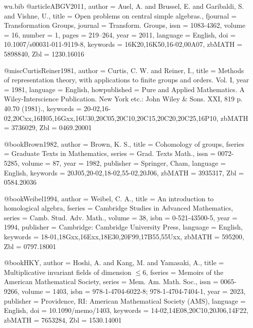 \documentclass[12pt,a4paper]{article}
\theoremstyle{definition}
\begin{document}
\begin{filecontents}{wu.bib}
@article{ABGV2011,
	author = {Auel, A. and Brussel, E. and Garibaldi, S. and Vishne, U.},
	title = {Open problems on central simple algebras.},
	fjournal = {Transformation Groups},
	journal = {Transform. Groups},
	issn = {1083-4362},
	volume = {16},
	number = {1},
	pages = {219--264},
	year = {2011},
	language = {English},
	doi = {10.1007/s00031-011-9119-8},
	keywords = {16K20,16K50,16-02,00A07},
	zbMATH = {5898840},
	Zbl = {1230.16016}
}	
	
	

@misc{CurtisReiner1981,
	author = {Curtis, C. W. and Reiner, I.},
title = {Methods of representation theory, with applications to finite groups
and orders. {Vol}. {I}}, year = {1981}, language = {English}, howpublished =
{Pure and {Applied} {Mathematics}. {A} {Wiley}-{Interscience} {Publication}.
{New} {York} etc.: {John} {Wiley} \& {Sons}. {XXI}, 819 p. {{\textsterling}}
40.70 (1981).}, keywords =
{20-02,16-02,20Cxx,16H05,16Gxx,16U30,20C05,20C10,20C15,20C20,20C25,16P10},
zbMATH = {3736029}, Zbl = {0469.20001} }

@book{Brown1982,
    author = {Brown, K. S.},
    title = {Cohomology of groups},
    fseries = {Graduate Texts in Mathematics},
    series = {Grad. Texts Math.},
    issn = {0072-5285},
    volume = {87},
    year = {1982},
    publisher = {Springer, Cham},
    language = {English},
    keywords = {20J05,20-02,18-02,55-02,20J06},
    zbMATH = {3935317},
    Zbl = {0584.20036}
}

@book{Weibel1994,
    author = {Weibel, C. A.},
    title = {An introduction to homological algebra},
    fseries = {Cambridge Studies in Advanced Mathematics},
    series = {Camb. Stud. Adv. Math.},
    volume = {38},
    isbn = {0-521-43500-5},
    year = {1994},
    publisher = {Cambridge: Cambridge University Press},
    language = {English},
    keywords = {18-01,18Gxx,16Exx,18E30,20F99,17B55,55Uxx},
    zbMATH = {595200},
    Zbl = {0797.18001}
}

@book{HKY,
    author = {Hoshi, A. and Kang, M. and Yamasaki, A.},
    title = {Multiplicative invariant fields of dimension {{\(\le 6\)}}},
    fseries = {Memoirs of the American Mathematical Society},
    series = {Mem. Am. Math. Soc.},
    issn = {0065-9266},
    volume = {1403},
    isbn = {978-1-4704-6022-8; 978-1-4704-7404-1},
    year = {2023},
    publisher = {Providence, RI: American Mathematical Society (AMS)},
    language = {English},
    doi = {10.1090/memo/1403},
    keywords = {14-02,14E08,20C10,20J06,14F22},
    zbMATH = {7653284},
    Zbl = {1530.14001}
}


\end{filecontents}
\end{document}
